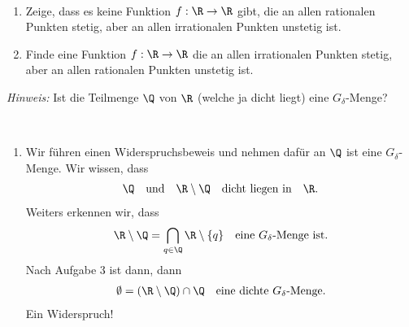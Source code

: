 \begin{exercise}
\leavevmode \\
\begin{enumerate}[label = (\roman*)]
  \item Zeige, dass es keine Funktion $f: \R \rightarrow \R$ gibt, die an allen rationalen
  Punkten stetig, aber an allen irrationalen Punkten unstetig ist.
  \item Finde eine
 Funktion $f: \R \rightarrow \R$ die an allen irrationalen Punkten stetig,
 aber an allen rationalen Punkten unstetig ist.
\end{enumerate}
\textit{Hinweis:} Ist die Teilmenge $\Q$ von $\R$ (welche ja dicht liegt)
eine $G_{\delta}$-Menge?
\end{exercise}
\begin{solution}
\leavevmode \\
\begin{enumerate}[label = (\roman*)]
  \item Wir führen einen Widerspruchsbeweis und nehmen dafür an $\Q$ ist eine $G_\delta$-Menge. Wir wissen, dass 
  \begin{align*}
    \Q \quad \textrm{und} \quad \R \setminus \Q \quad \textrm{dicht liegen in} \quad \R.
  \end{align*}
  Weiters erkennen wir, dass 
  \begin{align*}
    \R \setminus \Q = \bigcap_{q \in \Q} \R \setminus \{q\} \quad \textrm{eine $G_\delta$-Menge ist.}
  \end{align*}
  Nach Aufgabe 3 ist dann, dann 
  \begin{align*}
    \emptyset = (\R \setminus \Q) \cap \Q \quad \textrm{eine dichte $G_\delta$-Menge.}
  \end{align*}
  Ein Widerspruch!
  

\end{enumerate}
\end{solution}
